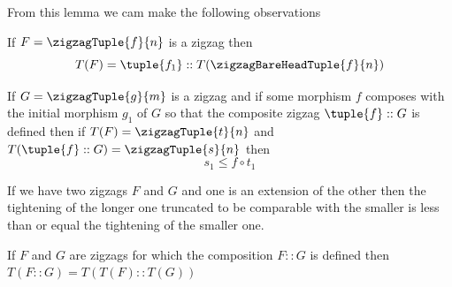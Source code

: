 From this lemma we cam make the following observations
\begin{observation}
If $F=\zigzagTuple{f}{n}$ is a zigzag then
\[
T(F) =  \tuple{f_1} :: T(\zigzagBareHeadTuple{f}{n}) 
\] 
\end{observation}


\begin{observation}
If  $G=\zigzagTuple{g}{m}$ is a zigzag 
and if some morphism $f$ composes with the  initial morphism $g_1$ of $G$
 so that the composite zigzag $\tuple{f} :: G$ is defined then
if $T(F)=\zigzagTuple{t}{n}$
and  $T(\tuple{f} :: G)=\zigzagTuple{s}{n}$ then
\[
s_1 \leq f \circ t_1
\]
\end{observation}

\begin{observation}
If we have two zigzags $F$ and $G$ and one is an extension of the other
then the tightening of the longer one truncated to be comparable with the smaller is less than or equal the tightening of the smaller one.
\end{observation}

\begin{lemma}
If $F$ and $G$ are zigzags for which the composition $F::G$ is defined
then 
$ T(F :: G) = T(T(F) :: T(G)) $
\end{lemma}

\newcommand{\tightenedComposite}[1]
{
\zigzagOneAndAHalf{w}{x}{#1}
\begin{array}{c}
\dots \\[0.8cm]
\dots
\end{array}
\begin{array}{c c}
\Ob{x}{n} \\[0.8cm]
& \Ob{w}{n}=
\end{array}
\begin{arrows}
\ncarr{xn}{wn} \blabel{#1'_{n-1}}[0.2][0.4] %
\end{arrows}
\kern-15pt
\arraycolsep=7pt
\zigzagFlex{y}{z}{#1}{n}{n+m}
}

